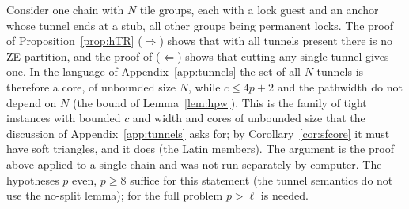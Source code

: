 \begin{remark}\label{rem:hchaincore}
Consider one chain with $N$ tile groups, each with a lock guest and an anchor whose tunnel ends at a stub, all other groups being permanent locks. The proof of Proposition~\ref{prop:hTR} ($\Rightarrow$) shows that with all tunnels present there is no ZE partition, and the proof of ($\Leftarrow$) shows that cutting any single tunnel gives one. In the language of Appendix~\ref{app:tunnels} the set of all $N$ tunnels is therefore a core, of unbounded size $N$, while $c\le4p+2$ and the pathwidth do not depend on $N$ (the bound of Lemma~\ref{lem:hpw}). This is the family of tight instances with bounded $c$ and width and cores of unbounded size that the discussion of Appendix~\ref{app:tunnels} asks for; by Corollary~\ref{cor:sfcore} it must have soft triangles, and it does (the Latin members). The argument is the proof above applied to a single chain and was not run separately by computer. The hypotheses $p$ even, $p\ge8$ suffice for this statement (the tunnel semantics do not use the no-split lemma); for the full problem $p>\ell$ is needed.
\end{remark}

